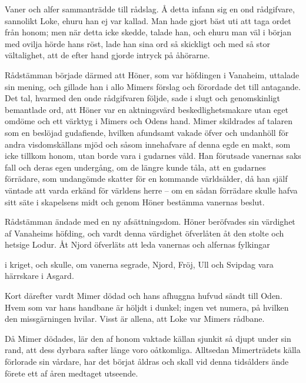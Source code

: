 Vaner och alfer sammanträdde till rådslag. Å detta infann sig en ond
rådgifvare, sannolikt Loke, ehuru han ej var kallad. Man hade gjort bäst
uti att taga ordet från honom; men när detta icke skedde, talade han,
och ehuru man väl i början med ovilja hörde hans röst, lade han sina ord
så skickligt och med så stor vältalighet, att de efter hand gjorde
intryck på åhörarne.

Rådstämman började därmed att Höner, som var höfdingen i Vanaheim,
uttalade sin mening, och gillade han i allo Mimers förslag och förordade
det till antagande. Det tal, hvarmed den onde rådgifvaren följde, sade i
slugt och genomskinligt bemantlade ord, att Höner var en aktningsvärd
beskedlighetsmakare utan eget omdöme och ett värktyg i Mimers och Odens
hand. Mimer skildrades af talaren som en beslöjad gudafiende, hvilken
afundsamt vakade öfver och undanhöll för andra visdomskällans mjöd och
såsom innehafvare af denna egde en makt, som icke tillkom honom, utan
borde vara i gudarnes våld. Han förutsade vanernas saks fall och deras
egen undergång, om de längre kunde tåla, att en gudarnes förrädare, som
undangömde skatter för en kommande världsålder, då han själf väntade att
varda erkänd för världens herre -- om en sådan förrädare skulle hafva
sitt säte i skapelsens midt och genom Höner bestämma vanernas beslut.

Rådstämman ändade med en ny afsättningsdom. Höner beröfvades sin
värdighet af Vanaheims höfding, och vardt denna värdighet öfverlåten åt
den stolte och hetsige Lodur. Åt Njord öfverläts att leda vanernas och
alfernas fylkingar

i kriget, och skulle, om vanerna segrade, Njord, Fröj, Ull och Svipdag
vara härrskare i Asgard.

Kort därefter vardt Mimer dödad och hans afhuggna hufvud sändt till
Oden. Hvem som var hans handbane är höljdt i dunkel; ingen vet numera,
på hvilken den missgärningen hvilar. Visst är allena, att Loke var
Mimers rådbane.

Då Mimer dödades, lär den af honom vaktade källan sjunkit så djupt under
sin rand, att dess dyrbara safter länge voro oåtkomliga. Alltsedan
Mimerträdets källa förlorade sin vårdare, har det börjat åldras och
skall vid denna tidsålders ände förete ett af åren medtaget utseende.

